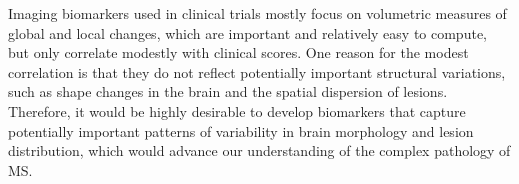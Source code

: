 Imaging biomarkers used in clinical trials mostly focus on volumetric measures
of global and local changes, which are important and relatively easy to compute,
but only correlate modestly with clinical scores. One reason for the modest
correlation is that they do not reflect potentially important structural
variations, such as shape changes in the brain and the spatial dispersion of
lesions. Therefore, it would be highly desirable to develop biomarkers that
capture potentially important patterns of variability in brain morphology and
lesion distribution, which would advance our understanding of the complex
pathology of MS.

%
% 
% 
% 
% 
% 


